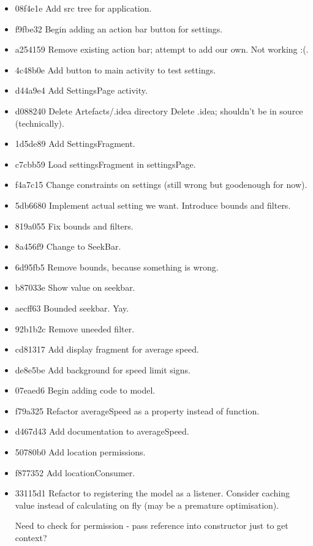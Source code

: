 \documentclass[11pt, a4paper, notitlepage]{report}
\begin{document}
\begin{itemize}
	\item 08f4e1e Add src tree for application. 
	\item f9fbe32 Begin adding an action bar button for settings. 
	\item a254159 Remove existing action bar; attempt to add our own. Not working :(. 
	\item 4c48b0e Add button to main activity to test settings. 
	\item d44a9e4 Add SettingsPage activity. 
	\item d088240 Delete Artefacts/.idea directory Delete .idea; shouldn't be in source (technically).
	\item 1d5de89 Add SettingsFragment. 
	\item c7cbb59 Load settingsFragment in settingsPage. 
	\item f4a7c15 Change constraints on settings (still wrong but goodenough for now). 
	\item 5db6680 Implement actual setting we want. Introduce bounds and filters. 
	\item 819a055 Fix bounds and filters. 
	\item 8a456f9 Change to SeekBar. 
	\item 6d95fb5 Remove bounds, because something is wrong. 
	\item b87033e Show value on seekbar. 
	\item aecff63 Bounded seekbar. Yay. 
	\item 92b1b2c Remove uneeded filter. 
	\item cd81317 Add display fragment for average speed. 
	\item de8e5be Add background for speed limit signs. 
	\item 07eaed6 Begin adding code to model. 
	\item f79a325 Refactor averageSpeed as a property instead of function. 
	\item d467d43 Add documentation to averageSpeed. 
	\item 50780b0 Add location permissions. 
	\item f877352 Add locationConsumer. 
	\item 33115d1 Refactor to registering the model as a listener. Consider caching value instead of calculating on fly (may be a premature optimisation).
	
	Need to check for permission - pass reference into constructor just to get context?
	

\end{itemize}
\end{document}
